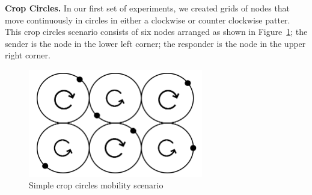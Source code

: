 
{\bf Crop Circles.} In our first set of experiments, we created grids
of nodes that move continuously in circles in either a clockwise or
counter clockwise patter. This crop circles scenario consists of six
nodes arranged as shown in Figure~\ref{fig:cropcircle1}; the sender is
the node in the lower left corner; the responder is the node in the
upper right corner.
\begin{figure}
\vspace{-.2cm}
\begin{center}
\includegraphics[width=3in]{figures/cropcircle1.png}
\end{center}
\vspace{-.75cm}
\caption{Simple crop circles mobility scenario}\label{fig:cropcircle1}
\vspace{-.25cm}
\end{figure}

